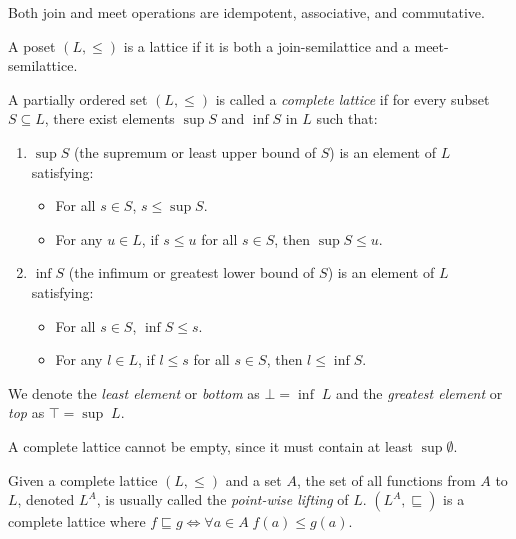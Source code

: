 \documentclass[
  10pt,       %
  twoside,    %
  a4paper,    %
  english,    %
  tikz,       %
  openright,  %
]{book}
\begin{document}
\begin{observation}
  Both join and meet operations are idempotent, associative, and commutative.
\end{observation}

\begin{definition}[Lattice]
  A poset $(L, \leq)$ is a lattice if it is both a join-semilattice and a 
  meet-semilattice.
\end{definition}

\begin{definition}
  A partially ordered set \((L, \leq)\) is called a \emph{complete lattice} if
  for every subset \(S \subseteq L\), there exist elements \(\sup S\) and
  \(\inf S\) in \(L\) such that: 
  \begin{enumerate}
    \item \(\sup S\) (the supremum or least upper bound of \(S\)) is an
      element of \(L\) satisfying: 
      \begin{itemize}
        \item For all \(s \in S\), \(s \leq \sup S\).
        \item For any \(u \in L\), if \(s \leq u\) for all \(s \in S\), then
          \(\sup S \leq u\). \end{itemize}
    \item \(\inf S\) (the infimum or greatest lower bound of \(S\)) is an
      element of \(L\) satisfying: 
      \begin{itemize}
        \item For all \(s \in S\), \(\inf S \leq s\).
        \item For any \(l \in L\), if \(l \leq s\) for all \(s \in S\), then
          \(l \leq \inf S\). 
      \end{itemize}
  \end{enumerate}

  We denote the \textit{least element} or \textit{bottom} as $\bot = \inf \; L$ 
  and the \textit{greatest element} or \textit{top} as $\top = \sup \; L$.
\end{definition}

\begin{observation}
  A complete lattice cannot be empty, since it must contain at least
  $\sup \emptyset$.
\end{observation}

\begin{definition}
Given a complete lattice $(L, \leq)$ and a set $A$, the set of all functions
from $A$ to $L$, denoted $L^A$, is usually called the \textit{point-wise
lifting} of $L$.
$(L^A, \sqsubseteq)$ is a complete lattice where $f \sqsubseteq g \iff \forall
a \in A \; f(a) \leq g(a)$.
\end{definition}
\end{document}
